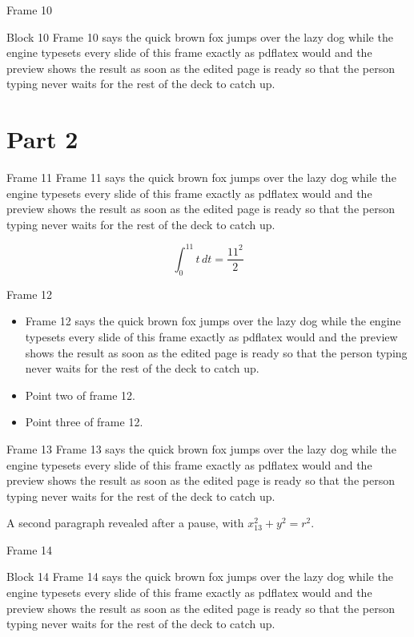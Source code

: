 \documentclass{beamer}
\begin{document}
\begin{frame}{Frame 10}
  \begin{block}{Block 10}
    Frame 10 says the quick brown fox jumps over the lazy dog while the engine typesets every slide of this frame exactly as pdflatex would and the preview shows the result as soon as the edited page is ready so that the person typing never waits for the rest of the deck to catch up.
  \end{block}
\end{frame}
\section{Part 2}
\begin{frame}{Frame 11}
  Frame 11 says the quick brown fox jumps over the lazy dog while the engine typesets every slide of this frame exactly as pdflatex would and the preview shows the result as soon as the edited page is ready so that the person typing never waits for the rest of the deck to catch up.

  \[ \int_0^{11} t\,dt = \frac{11^2}{2} \]
\end{frame}
\begin{frame}{Frame 12}
  \begin{itemize}
    \item<1-> Frame 12 says the quick brown fox jumps over the lazy dog while the engine typesets every slide of this frame exactly as pdflatex would and the preview shows the result as soon as the edited page is ready so that the person typing never waits for the rest of the deck to catch up.
    \item<2-> Point two of frame 12.
    \item<3-> Point three of frame 12.
  \end{itemize}
\end{frame}
\begin{frame}{Frame 13}
  Frame 13 says the quick brown fox jumps over the lazy dog while the engine typesets every slide of this frame exactly as pdflatex would and the preview shows the result as soon as the edited page is ready so that the person typing never waits for the rest of the deck to catch up.
  \pause

  A second paragraph revealed after a pause, with $x_{13}^2 + y^2 = r^2$.
\end{frame}
\begin{frame}{Frame 14}
  \begin{block}{Block 14}
    Frame 14 says the quick brown fox jumps over the lazy dog while the engine typesets every slide of this frame exactly as pdflatex would and the preview shows the result as soon as the edited page is ready so that the person typing never waits for the rest of the deck to catch up.
  \end{block}
\end{frame}
\end{document}

